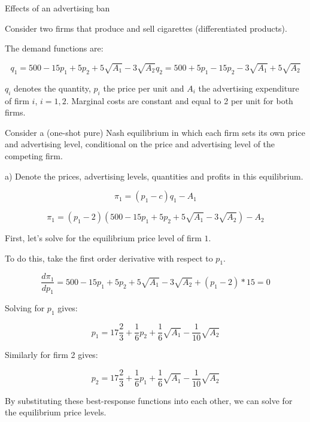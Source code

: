\documentclass[12pt,english]{article}%
\begin{document}
Effects of an advertising ban

Consider two firms that produce and sell cigarettes (differentiated products).

The demand functions are:

\begin{equation}
q_1=500-15p_1+5p_2+5\sqrt{A_1}-3\sqrt{A_2}
q_2=500+5p_1-15p_2-3\sqrt{A_1}+5\sqrt{A_2}
\end{equation}

$q_i$ denotes the quantity, $p_i$ the price per unit and $A_i$ the advertising expenditure of firm $i$, $i=1,2$.
Marginal costs are constant and equal to 2 per unit for both firms. 

Consider a (one-shot pure) Nash equilibrium in which each firm sets its own price and advertising level, conditional on the price and advertising level of the competing firm. 

a) Denote the prices, advertising levels, quantities and profits in this equilibrium.

\begin{equation}
\pi_1=(p_1-c)q_1-A_1
\end{equation}

\begin{equation}
\pi_1=(p_1-2)(500-15p_1+5p_2+5\sqrt{A_1}-3\sqrt{A_2})-A_2
\end{equation}


First, let's solve for the equilibrium price level of firm $1$.
 
To do this, take the first order derivative with respect to $p_1$.

\begin{equation}
\frac{d\pi_1}{dp_1}=500-15p_1+5p_2+5\sqrt{A_1}-3\sqrt{A_2}+(p_1-2)*15=0
\end{equation}

Solving for $p_1$ gives:

\begin{equation}
p_1=17\frac{2}{3}+\frac{1}{6}p_2+\frac{1}{6}\sqrt{A_1}-\frac{1}{10}\sqrt{A_2}
\end{equation}

Similarly for firm 2 gives:

\begin{equation}
p_2=17\frac{2}{3}+\frac{1}{6}p_1+\frac{1}{6}\sqrt{A_1}-\frac{1}{10}\sqrt{A_2}
\end{equation}

By substituting these best-response functions into each other, we can solve for the equilibrium price levels. 
\end{document}
